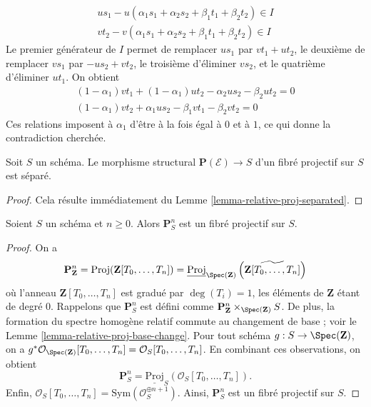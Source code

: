 \begin{example}
$$\begin{matrix}
us_1 - u(\alpha_1s_1 + \alpha_2s_2 + \beta_1t_1 + \beta_2t_2)
\in I \\
vt_2 - v(\alpha_1s_1 + \alpha_2s_2 + \beta_1t_1 + \beta_2t_2)
\in I
\end{matrix}
$$
Le premier générateur de $I$ permet de remplacer $us_1$ par $vt_1 + ut_2$,
le deuxième de remplacer $vs_1$ par $-us_2 + vt_2$, le troisième d'éliminer
$vs_2$, et le quatrième d'éliminer $ut_1$. On obtient
$$
\begin{matrix}
(1 - \alpha_1)vt_1 + (1 - \alpha_1)ut_2 - \alpha_2us_2 - \beta_2ut_2 = 0 \\
(1 - \alpha_1)vt_2 + \alpha_1us_2 - \beta_1vt_1 - \beta_2vt_2 = 0
\end{matrix}
$$
Ces relations imposent à $\alpha_1$ d'être à la fois égal à $0$ et à $1$,
ce qui donne la contradiction cherchée.
\end{example}


\begin{lemma}
\label{lemma-projective-bundle-separated}
Soit $S$ un schéma. Le morphisme structural
$\mathbf{P}(\mathcal{E}) \to S$ d'un fibré projectif sur $S$ est séparé.
\end{lemma}

\begin{proof}
Cela résulte immédiatement du Lemme \ref{lemma-relative-proj-separated}.
\end{proof}

\begin{lemma}
\label{lemma-projective-space-bundle}
Soient $S$ un schéma et $n \geq 0$. Alors $\mathbf{P}^n_S$ est un fibré
projectif sur $S$.
\end{lemma}

\begin{proof}
On a
$$
\mathbf{P}^n_{\mathbf{Z}} =
\text{Proj}(\mathbf{Z}[T_0, \ldots, T_n]) =
\underline{\text{Proj}}_{\Spec(\mathbf{Z})}
\left(\widetilde{\mathbf{Z}[T_0, \ldots, T_n]}\right)
$$
où l'anneau $\mathbf{Z}[T_0, \ldots, T_n]$ est gradué par
$\deg(T_i) = 1$, les éléments de $\mathbf{Z}$ étant de degré $0$.
Rappelons que $\mathbf{P}^n_S$ est défini comme
$\mathbf{P}^n_{\mathbf{Z}} \times_{\Spec(\mathbf{Z})} S$.
De plus, la formation du spectre homogène relatif commute au changement de
base ; voir le Lemme \ref{lemma-relative-proj-base-change}.
Pour tout schéma $g : S \to \Spec(\mathbf{Z})$, on a
$g^*\mathcal{O}_{\Spec(\mathbf{Z})}[T_0, \ldots, T_n]
= \mathcal{O}_S[T_0, \ldots, T_n]$.
En combinant ces observations, on obtient
$$
\mathbf{P}^n_S = \underline{\text{Proj}}_S(\mathcal{O}_S[T_0, \ldots, T_n]).
$$
Enfin,
$\mathcal{O}_S[T_0, \ldots, T_n] = \text{Sym}(\mathcal{O}_S^{\oplus n + 1})$.
Ainsi, $\mathbf{P}^n_S$ est un fibré projectif sur $S$.
\end{proof}


